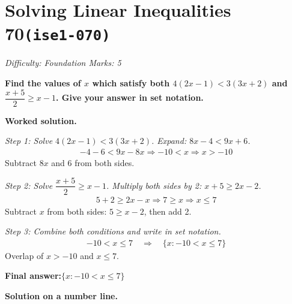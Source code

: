 \documentclass[11pt]{article}
\newcommand{\question}[1]{\par\medskip\noindent\textbf{#1}\par}
\begin{document}
\section*{Solving Linear Inequalities 70\quad\small\texttt{(ise1-070)}}
\textit{Difficulty: Foundation \quad\textbar\quad Marks: 5}

\question{Find the values of \( x \) which satisfy both \( 4(2x - 1) < 3(3x + 2) \) and \( \dfrac{x + 5}{2} \geq x - 1 \). Give your answer in set notation.}

\textbf{Worked solution.}

\textit{Step 1: Solve \( 4(2x - 1) < 3(3x + 2) \). Expand: \( 8x - 4 < 9x + 6 \).}
\[\begin{gathered}
-4 - 6 < 9x - 8x \Rightarrow -10 < x \Rightarrow x > -10
\end{gathered}\]
Subtract \( 8x \) and 6 from both sides.

\textit{Step 2: Solve \( \dfrac{x + 5}{2} \geq x - 1 \). Multiply both sides by 2: \( x + 5 \geq 2x - 2 \).}
\[\begin{gathered}
5 + 2 \geq 2x - x \Rightarrow 7 \geq x \Rightarrow x \leq 7
\end{gathered}\]
Subtract \( x \) from both sides: \( 5 \geq x - 2 \), then add 2.

\textit{Step 3: Combine both conditions and write in set notation.}
\[\begin{gathered}
-10 < x \leq 7 \quad \Rightarrow \quad \{x : -10 < x \leq 7\}
\end{gathered}\]
Overlap of \( x > -10 \) and \( x \leq 7 \).

\begin{answerbox}
\textbf{Final answer:}\quad \(\displaystyle  \{x : -10 < x \leq 7\} \)
\end{answerbox}
\textbf{Solution on a number line.}
\end{document}

